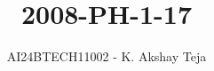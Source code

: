 \documentclass[journal,9pt,onecolumn]{IEEEtran}
\begin{document}

\vspace{3cm}
\title{2008-PH-1-17}
\author{AI24BTECH11002 - K. Akshay Teja}
\maketitle
 \bigskip
{\let\newpage\relax\maketitle}

\renewcommand{\thefigure}{\theenumi}
\renewcommand{\thetable}{\theenumi}
\setlength{\intextsep}{10pt} %

\renewcommand{\thetable}{\theenumi}
\end{document}
